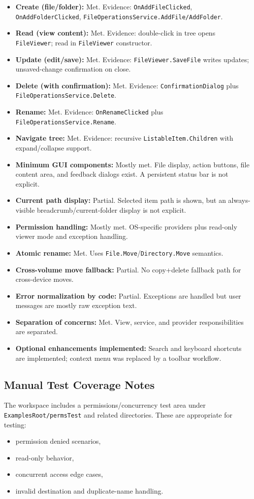 \documentclass[11pt]{article}
\begin{document}
\begin{itemize}
  \item \textbf{Create (file/folder):} Met. Evidence: \texttt{OnAddFileClicked}, \texttt{OnAddFolderClicked}, \texttt{FileOperationsService.AddFile/AddFolder}.
  \item \textbf{Read (view content):} Met. Evidence: double-click in tree opens \texttt{FileViewer}; read in \texttt{FileViewer} constructor.
  \item \textbf{Update (edit/save):} Met. Evidence: \texttt{FileViewer.SaveFile} writes updates; unsaved-change confirmation on close.
  \item \textbf{Delete (with confirmation):} Met. Evidence: \texttt{ConfirmationDialog} plus \texttt{FileOperationsService.Delete}.
  \item \textbf{Rename:} Met. Evidence: \texttt{OnRenameClicked} plus \texttt{FileOperationsService.Rename}.
  \item \textbf{Navigate tree:} Met. Evidence: recursive \texttt{ListableItem.Children} with expand/collapse support.
  \item \textbf{Minimum GUI components:} Mostly met. File display, action buttons, file content area, and feedback dialogs exist. A persistent status bar is not explicit.
  \item \textbf{Current path display:} Partial. Selected item path is shown, but an always-visible breadcrumb/current-folder display is not explicit.
  \item \textbf{Permission handling:} Mostly met. OS-specific providers plus read-only viewer mode and exception handling.
  \item \textbf{Atomic rename:} Met. Uses \texttt{File.Move}/\texttt{Directory.Move} semantics.
  \item \textbf{Cross-volume move fallback:} Partial. No copy+delete fallback path for cross-device moves.
  \item \textbf{Error normalization by code:} Partial. Exceptions are handled but user messages are mostly raw exception text.
  \item \textbf{Separation of concerns:} Met. View, service, and provider responsibilities are separated.
  \item \textbf{Optional enhancements implemented:} Search and keyboard shortcuts are implemented; context menu was replaced by a toolbar workflow.
\end{itemize}

\subsection*{Manual Test Coverage Notes}
The workspace includes a permissions/concurrency test area under \texttt{ExamplesRoot/permsTest} and related directories. These are appropriate for testing:
\begin{itemize}
  \item permission denied scenarios,
  \item read-only behavior,
  \item concurrent access edge cases,
  \item invalid destination and duplicate-name handling.
\end{itemize}
\end{document}
